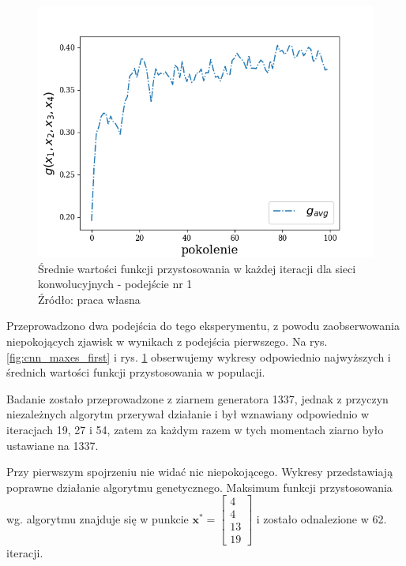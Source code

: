 \begin{figure}[h!tb]
	 \centering
	 \includegraphics[width = 0.9\linewidth]{img/cnn_means_first}
	 \caption{Średnie wartości funkcji przystosowania w każdej iteracji dla sieci konwolucyjnych - podejście nr 1\\
              Źródło: praca własna}
	 \label{fig:cnn_means_first}
\end{figure}

Przeprowadzono dwa podejścia do tego eksperymentu, z powodu zaobserwowania niepokojących zjawisk w wynikach z podejścia pierwszego.
Na rys. \ref{fig:cnn_maxes_first} i rys. \ref{fig:cnn_means_first} obserwujemy wykresy odpowiednio najwyższych i średnich wartości funkcji przystosowania w populacji.

Badanie zostało przeprowadzone z ziarnem generatora 1337, jednak z przyczyn niezależnych algorytm przerywał działanie i był wznawiany odpowiednio w iteracjach 19, 27 i 54, zatem za każdym razem w tych momentach ziarno było ustawiane na 1337.

Przy pierwszym spojrzeniu nie widać nic niepokojącego.
Wykresy przedstawiają poprawne działanie algorytmu genetycznego.
Maksimum funkcji przystosowania wg. algorytmu znajduje się w punkcie $\mathbf{x^*} = \begin{bmatrix}4 \\ 4 \\ 13 \\ 19\end{bmatrix}$ i zostało odnalezione w 62. iteracji.

